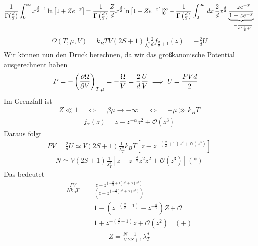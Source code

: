 %
%
\begin{align*}
  \frac{1}{\Gamma(\frac{d}{2})} \int_{0}^{ \infty} x^{\frac{d}{2} - 1}
  \ln{\left[  1 + Z e^{-x} \right]} = 
  \frac{1}{\Gamma\left( \frac{d}{2} \right)} \frac{Z}{d} x^{\frac{d}{2}}
  \ln{\left[ 1 + Z e^{-x} \right]} |_0^\infty
  - \frac{1}{\Gamma\left( \frac{d}{2} \right)} \int_{0}^{\infty}
  \,dx\, \frac{2}{d} x^{\frac{d}{2}} 
  \underbrace{\frac{-z e^{-x}}{1 + z e^{-x}}}_{=  - \frac{1}{e^{x} \frac{1}{z} + 1}}
 \end{align*}
%
%
\begin{align*}
  \Omega(T, \mu, V) = k_B T V \left( 2 S + 1 \right) 
  \frac{1}{\lambda_T^d} \frac{2}{d} f_{\frac{d}{2} + 1}(z) = 
  - \frac{2}{d} U
\end{align*}
%
Wir können nun den Druck berechnen, da wir das großkanonische Potential ausgerechnent
haben
%
\begin{align*}
  P & = - \left( \frac{\partial \Omega }{\partial V} \right)_{T, \mu} = 
  - \frac{\Omega}{V} = \frac{2}{d} \frac{U}{V} 
  \implies U = \frac{PV d}{2}
\end{align*}
%
Im Grenzfall ist
%
\begin{align*}
  Z \ll 1 && \iff && \beta \mu \to -\infty && \iff && - \mu \gg k_B T
\end{align*}
%
%
\begin{align*}
  f_\alpha(z) = z - z^{-\alpha} z^2 + \mathcal{O}(z^3)
\end{align*}
%
Daraus folgt
%
\begin{align*}
  P V = \frac{2}{d} U \simeq V (2 S + 1) 
  \frac{1}{\lambda_T^d} k_B T \left[ z - z^{-\left( \frac{d}{2} + 1 \right)
  z^2 + \mathcal{O}(z^3)} \right]
\end{align*}
%
%
\begin{align*}
  N \simeq V (2 S + 1) 
  \frac{1}{\lambda_T^d} \left[ z - z^{-\frac{d}{2}} z^2 z^2 + \mathcal{O}(z^3) \right] (*)
\end{align*}
%
Das bedeutet
%
\begin{align*}
  \frac{P V }{N k_B T} & = 
  \frac{z - z ^{\left( - \frac{d}{2} + 1 \right) z^2 + \mathcal{O}(z^3)}}{
    (z - z ^{\left( - \frac{d}{2} \right) z^2 + \mathcal{O}(z^3)}) } \\
    & = 1 - \left( z^{-\left( \frac{d}{2} + 1\right)} - z^{-\frac{d}{2}} \right)Z
    + \mathcal{O} \\
    & = 1 + z^{-\left( \frac{d}{2} + 1 \right)} z + \mathcal{O}(z^2) \quad (+)
\end{align*}
%
%
\begin{align*}
  Z = \frac{N}{V} \frac{1 }{2 S + 1} \lambda_T^d 
\end{align*}
